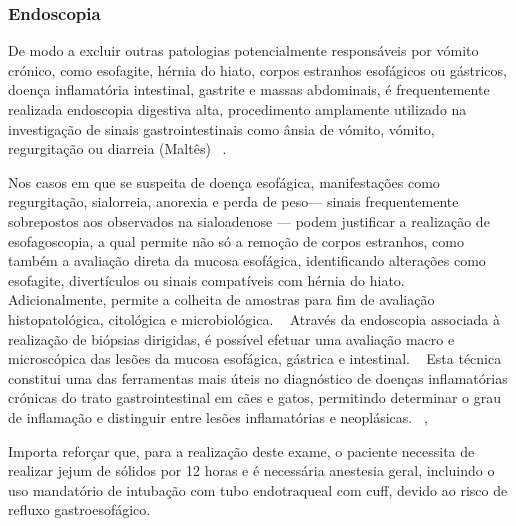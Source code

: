 \subsubsection{Endoscopia}


De modo a excluir outras patologias potencialmente responsáveis por vómito crónico, como esofagite, hérnia do hiato, corpos estranhos esofágicos ou gástricos, doença inflamatória intestinal, gastrite e massas abdominais, é frequentemente realizada endoscopia digestiva alta, procedimento amplamente utilizado na investigação de sinais gastrointestinais como ânsia de vómito, vómito, regurgitação ou diarreia (Maltês) ~\cite{mccarthy_veterinary_2021}.


Nos casos em que se suspeita de doença esofágica, manifestações como regurgitação, sialorreia, anorexia e perda de peso— sinais frequentemente sobrepostos aos observados na sialoadenose — podem justificar a realização de esofagoscopia, a qual permite não só a remoção de corpos estranhos, como também a avaliação direta da mucosa esofágica, identificando alterações como esofagite, divertículos ou sinais compatíveis com hérnia do hiato. ~\cite{Sum2009} Adicionalmente, permite a colheita de amostras para fim de avaliação histopatológica, citológica e microbiológica. ~\cite{Prasanna2019} Através da endoscopia associada à realização de biópsias dirigidas, é possível efetuar uma avaliação macro e microscópica das lesões da mucosa esofágica, gástrica e intestinal. ~\cite{Rychlik2020} Esta técnica constitui uma das ferramentas mais úteis no diagnóstico de doenças inflamatórias crónicas do trato gastrointestinal em cães e gatos, permitindo determinar o grau de inflamação e distinguir entre lesões inflamatórias e neoplásicas. ~\cite{Rychlik2020},~\cite{Jergens2016}


Importa reforçar que, para a realização deste exame, o paciente necessita de realizar jejum de sólidos por 12 horas e é necessária anestesia geral, incluindo o uso mandatório de intubação com tubo endotraqueal com cuff, devido ao risco de refluxo gastroesofágico. ~\cite{lhermette_bsava_2021,mccarthy_veterinary_2021}


